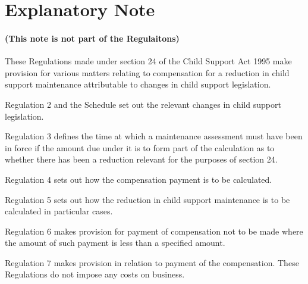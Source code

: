 \documentclass[a4paper]{article}
\newcommand{\parthead}{}
\begin{document}
\part{Explanatory Note}

\renewcommand\parthead{--- Explanatory Note}

\subsection*{(This note is not part of the Regulaitons)}

These Regulations made under section 24 of the Child Support Act 1995 make provision for various matters relating to compensation for a reduction in child support maintenance attributable to changes in child support legislation.

  Regulation 2 and the Schedule set out the relevant changes in child support legislation.

  Regulation 3 defines the time at which a maintenance assessment must have been in force if the amount due under it is to form part of the calculation as to whether there has been a reduction relevant for the purposes of section 24.

  Regulation 4 sets out how the compensation payment is to be calculated.

  Regulation 5 sets out how the reduction in child support maintenance is to be calculated in particular cases.

  Regulation 6 makes provision for payment of compensation not to be made where the amount of such payment is less than a specified amount.

  Regulation 7 makes provision in relation to payment of the compensation.
  These Regulations do not impose any costs on business.
\end{document}
